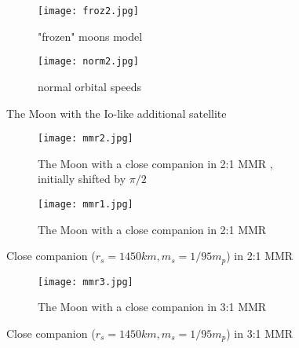 \documentclass[12pt]{article}
\begin{document}
 


\begin{figure}[h]
\begin{subfigure}{0.5\textwidth}
\texttt{[image: froz2.jpg]} 
\caption{"frozen" moons model}
\label{fig:subim1}
\end{subfigure}
\begin{subfigure}{0.5\textwidth}
\texttt{[image: norm2.jpg]}
\caption{normal orbital speeds}
\label{fig:subim2}
\end{subfigure}
\caption{The Moon with the Io-like additional satellite}
\label{fig:image2}
\end{figure}




\begin{figure}[h]
 \begin{subfigure}{0.5\textwidth}
\texttt{[image: mmr2.jpg]} 
\caption{The Moon with a close companion in 2:1 MMR , initially shifted  by $\pi/2$}
\label{fig:subim1}
\end{subfigure} 
\begin{subfigure}{0.5\textwidth}
\texttt{[image: mmr1.jpg]} 
\caption{The Moon with a close companion in 2:1 MMR}
\label{fig:subim1}
\end{subfigure}
\caption{Close companion
($r_s =1450 km, m_s=1/95 m_p$) in 2:1 MMR}
\end{figure}

\begin{figure}[h]
\begin{subfigure}{0.5\textwidth}
\texttt{[image: mmr3.jpg]}
\caption{The Moon with a close companion in 3:1 MMR}
\label{fig:subim2}
\end{subfigure}
\label{fig:image2}
\caption{Close companion
($r_s =1450 km, m_s=1/95 m_p$) in 3:1 MMR}
\end{figure}
\end{document}
